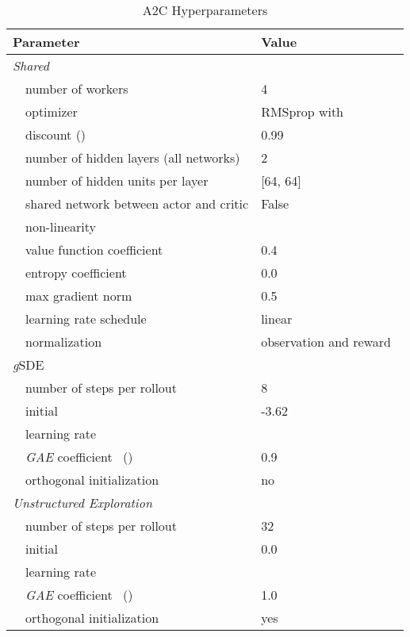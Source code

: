 \documentclass{article}
\newcommand{\ourSDE}{\textit{g}\textsc{SDE}\xspace}
\newcommand{\aac}{\textsc{A2C}\xspace}
\begin{document}
\begin{table}[h]
\renewcommand{\arraystretch}{1.1}
\centering
\caption{\aac Hyperparameters}
\label{tab:a2c_shared_params}
\vspace{1mm}
  \begin{tabular}{@{}l l| l@{}}
    \toprule
    \multicolumn{2}{l|}{Parameter} &  Value\\
    \midrule
    \multicolumn{2}{l|}{\textit{Shared}}& \\
    & number of workers &  4\\
    & optimizer & RMSprop with \\
    & discount () &  0.99\\
    & number of hidden layers (all networks) & 2\\
    & number of hidden units per layer & [64, 64]\\
    & shared network between actor and critic & False\\
    & non-linearity & \\
    & value function coefficient & 0.4\\
    & entropy coefficient & 0.0\\
    & max gradient norm & 0.5\\
    & learning rate schedule & linear \\
    & normalization & observation and reward~\citep{hill2018stable}\\
    \midrule
    \multicolumn{2}{l|}{\ourSDE}& \\
    & number of steps per rollout &  8\\
    & initial  & -3.62\\
    & learning rate & \\
    & \textit{GAE} coefficient~\citep{schulman2015high} () &  0.9\\
    & orthogonal initialization~\citep{engstrom2020implementation} & no \\
    \midrule
    \multicolumn{2}{l|}{\textit{Unstructured Exploration}}& \\
    & number of steps per rollout & 32\\
    & initial  & 0.0\\
    & learning rate & \\
    & \textit{GAE} coefficient~\citep{schulman2015high} () &  1.0\\
    & orthogonal initialization~\citep{engstrom2020implementation} & yes \\

    \bottomrule
  \end{tabular}
\end{table}
\end{document}
